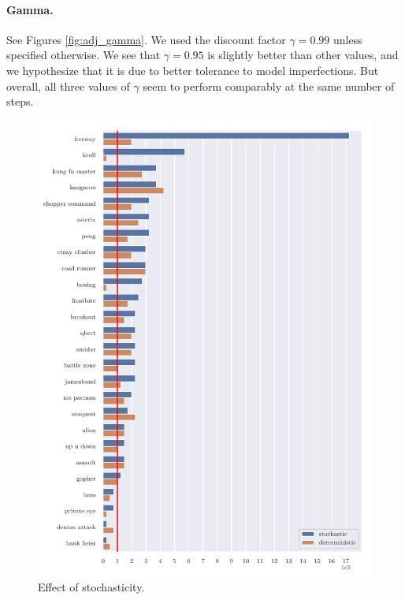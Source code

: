 \paragraph{Gamma.} See Figures \ref{fig:adj_gamma}. We used the discount factor $\gamma=0.99$ unless specified otherwise.  We see that $\gamma=0.95$ is slightly better than other values, and we hypothesize that it is due to better tolerance to model imperfections. But overall, all three values of $\gamma$ seem to perform comparably at the same number of steps.

\begin{figure}
\centering
\includegraphics[width=0.9\columnwidth]{figures/graph_Effect_of_stochasticity.pdf}
\caption{Effect of stochasticity.} 
\label{fig:effects_stocha}
\end{figure}

